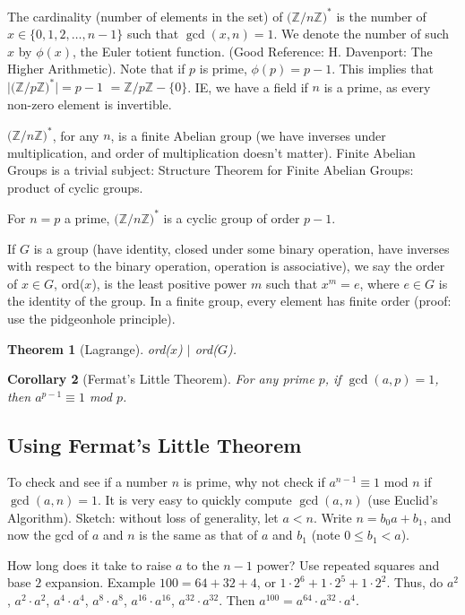 \documentclass[12pt,letterpaper]{report}
\newcommand{\Z}{\ensuremath{\mathbb{Z}}}
\newtheorem{thm}{Theorem}[section]
\newtheorem{cor}[thm]{Corollary}
\begin{document}
The cardinality (number of elements in the set) of $\Big(\Z / n\Z
\Big)^{*}$ is the number of $x \in \{0,1,2,\dots, n-1\}$ such that
$\gcd(x,n) = 1$. We denote the number of such $x$ by $\phi(x)$,
the Euler totient function. (Good Reference: H. Davenport: The
Higher Arithmetic). Note that if $p$ is prime, $\phi(p) = p-1$.
This implies that $\Big| \Big(\Z / p\Z \Big)^{*}\Big| = p-1$ $=
\Z/ p\Z - \{0\}$. IE, we have a field if $n$ is a prime, as every
non-zero element is invertible.

$\Big(\Z / n\Z \Big)^{*}$, for any $n$, is a finite Abelian group
(we have inverses under multiplication, and order of
multiplication doesn't matter). Finite Abelian Groups is a trivial
subject: Structure Theorem for Finite Abelian Groups: product of
cyclic groups.

For $n = p$ a prime, $\Big(\Z / n\Z \Big)^{*}$ is a cyclic group
of order $p-1$.

If $G$ is a group (have identity, closed under some binary
operation, have inverses with respect to the binary operation,
operation is associative), we say the order of $x \in G$,
ord($x$), is the least positive power $m$ such that $x^m = e$,
where $e \in G$ is the identity of the group. In a finite group,
every element has finite order (proof: use the pidgeonhole
principle).

\begin{thm}[Lagrange]ord($x$) $|$ ord($G$).
\end{thm}

\begin{cor}[Fermat's Little Theorem]For any prime $p$, if
$\gcd(a,p) = 1$, then $a^{p-1} \equiv 1$ mod $p$.
\end{cor}

\subsection{Using Fermat's Little Theorem}

To check and see if a number $n$ is prime, why not check if
$a^{n-1} \equiv 1$ mod $n$ if $\gcd(a,n) = 1$. It is very easy to
quickly compute $\gcd(a,n)$ (use Euclid's Algorithm). Sketch:
without loss of generality, let $a < n$. Write $n = b_0 a + b_1$,
and now the gcd of $a$ and $n$ is the same as that of $a$ and
$b_1$ (note $0 \le b_1 < a$).

How long does it take to raise $a$ to the $n-1$ power? Use
repeated squares and base $2$ expansion. Example $100 = 64 + 32 +
4$, or $1 \cdot 2^6 + 1\cdot 2^5 + 1\cdot 2^2$. Thus, do $a^2$,
$a^2 \cdot a^2$, $a^4 \cdot a^4$, $a^8 \cdot a^8$, $a^{16} \cdot
a^{16}$, $a^{32} \cdot a^{32}$. Then $a^{100} = a^{64} \cdot
a^{32} \cdot a^{4}$.
\end{document}
